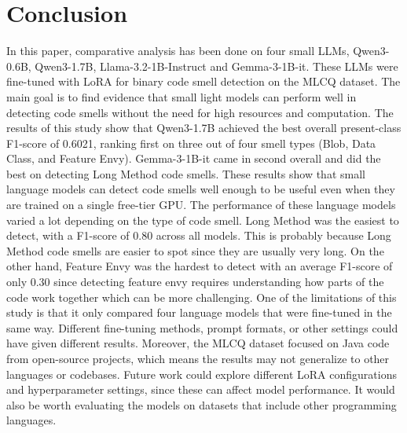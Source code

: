 \section{Conclusion}
\label{sec:conclusion}
In this paper, comparative analysis has been done on four small LLMs, Qwen3-0.6B, Qwen3-1.7B, Llama-3.2-1B-Instruct and Gemma-3-1B-it. These LLMs were fine-tuned with LoRA for binary code smell detection on the MLCQ dataset. The main goal is to find evidence that small light models can perform well in detecting code smells without the need for high resources and computation.
The results of this study show that Qwen3-1.7B achieved the best overall present-class F1-score of 0.6021, ranking first on three out of four smell types (Blob, Data Class, and Feature Envy). Gemma-3-1B-it came in second overall and did the best on detecting Long Method code smells. These results show that small language models can detect code smells well enough to be useful even when they are trained on a single free-tier GPU.
The performance of these language models varied a lot depending on the type of code smell. Long Method was the easiest to detect, with a F1-score of 0.80 across all models. This is probably because Long Method code smells are easier to spot since they are usually very long. On the other hand, Feature Envy was the hardest to detect with an average F1-score of only 0.30 since detecting feature envy requires understanding how parts of the code work together which can be more challenging.
One of the limitations of this study is that it only compared four language models that were fine-tuned in the same way. Different fine-tuning methods, prompt formats, or other settings could have given different results. Moreover, the MLCQ dataset focused on Java code from open-source projects, which means the results may not generalize to other languages or codebases.
Future work could explore different LoRA configurations and hyperparameter settings, since these can affect model performance. It would also be worth evaluating the models on datasets that include other programming languages.

